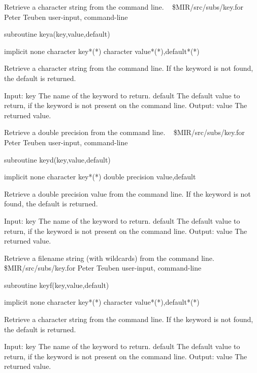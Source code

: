 %
\noindent Retrieve a character string from the command line.
\newline \ 
\newline {} \$MIR/src/subs/key.for
\newline {} Peter Teuben
\newline {} user-input, command-line
\par{\tenpoint
{\eightpoint\begintt
        subroutine keya(key,value,default)

        implicit none
        character key*(*)
        character value*(*),default*(*)

  Retrieve a character string from the command line. If the keyword is
  not found, the default is returned.

  Input:
    key        The name of the keyword to return.
    default    The default value to return, if the keyword is not present
               on the command line.
  Output:
    value      The returned value.
\endtt}
\par}
%
\noindent Retrieve a double precision from the command line.
\newline \ 
\newline {} \$MIR/src/subs/key.for
\newline {} Peter Teuben
\newline \abox{Keywords:} user-input, command-line
\par{\tenpoint
{\eightpoint\begintt
        subroutine keyd(key,value,default)

        implicit none
        character key*(*)
        double precision value,default

  Retrieve a double precision value from the command line. If the keyword is
  not found, the default is returned.

  Input:
    key        The name of the keyword to return.
    default    The default value to return, if the keyword is not present
               on the command line.
  Output:
    value      The returned value.
\endtt}
\par}
%
\noindent Retrieve a filename string (with wildcards) from the command line.
\newline \ 
\newline {} \$MIR/src/subs/key.for
\newline \abox{Responsible:} Peter Teuben
\newline {} user-input, command-line
\par{\tenpoint
{\eightpoint\begintt
        subroutine keyf(key,value,default)

        implicit none
        character key*(*)
        character value*(*),default*(*)

  Retrieve a character string from the command line. If the keyword is
  not found, the default is returned.

  Input:
    key        The name of the keyword to return.
    default    The default value to return, if the keyword is not present
               on the command line.
  Output:
    value      The returned value.
\endtt}
\par}
